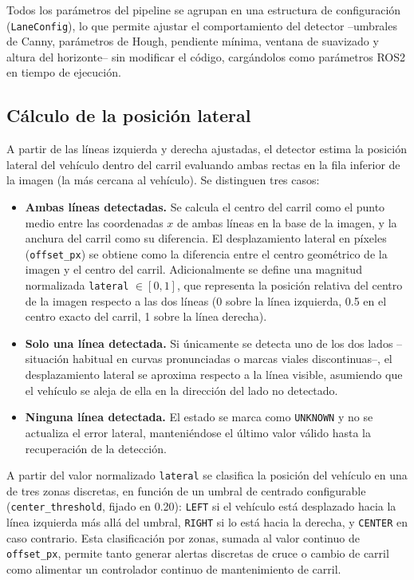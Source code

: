 \documentclass[12pt, a4paper]{article}
\begin{document}
Todos los parámetros del pipeline se agrupan en una estructura de configuración (\texttt{LaneConfig}), lo que permite ajustar el comportamiento del detector --umbrales de Canny, parámetros de Hough, pendiente mínima, ventana de suavizado y altura del horizonte-- sin modificar el código, cargándolos como parámetros ROS2 en tiempo de ejecución.

\subsection{Cálculo de la posición lateral}

A partir de las líneas izquierda y derecha ajustadas, el detector estima la posición lateral del vehículo dentro del carril evaluando ambas rectas en la fila inferior de la imagen (la más cercana al vehículo). Se distinguen tres casos:

\begin{itemize}
	\item \textbf{Ambas líneas detectadas.} Se calcula el centro del carril como el punto medio entre las coordenadas $x$ de ambas líneas en la base de la imagen, y la anchura del carril como su diferencia. El desplazamiento lateral en píxeles (\texttt{offset\_px}) se obtiene como la diferencia entre el centro geométrico de la imagen y el centro del carril. Adicionalmente se define una magnitud normalizada \texttt{lateral} $\in [0, 1]$, que representa la posición relativa del centro de la imagen respecto a las dos líneas (0 sobre la línea izquierda, 0.5 en el centro exacto del carril, 1 sobre la línea derecha).
	\item \textbf{Solo una línea detectada.} Si únicamente se detecta uno de los dos lados --situación habitual en curvas pronunciadas o marcas viales discontinuas--, el desplazamiento lateral se aproxima respecto a la línea visible, asumiendo que el vehículo se aleja de ella en la dirección del lado no detectado.
	\item \textbf{Ninguna línea detectada.} El estado se marca como \texttt{UNKNOWN} y no se actualiza el error lateral, manteniéndose el último valor válido hasta la recuperación de la detección.
\end{itemize}

A partir del valor normalizado \texttt{lateral} se clasifica la posición del vehículo en una de tres zonas discretas, en función de un umbral de centrado configurable (\texttt{center\_threshold}, fijado en 0.20): \texttt{LEFT} si el vehículo está desplazado hacia la línea izquierda más allá del umbral, \texttt{RIGHT} si lo está hacia la derecha, y \texttt{CENTER} en caso contrario. Esta clasificación por zonas, sumada al valor continuo de \texttt{offset\_px}, permite tanto generar alertas discretas de cruce o cambio de carril como alimentar un controlador continuo de mantenimiento de carril.
\end{document}

